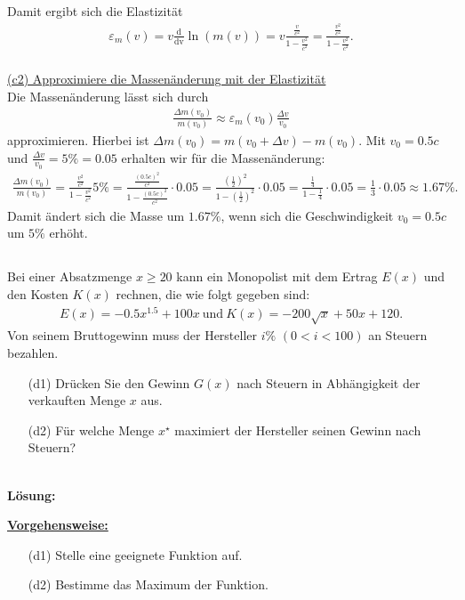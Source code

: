 Damit ergibt sich die Elastizität 
\begin{align*}
	\varepsilon_m(v) = v \frac{\mathrm{d}}{\mathrm{dv}}\ln(m(v))=
	v \frac{\frac{v}{c^2}}{1 - \frac{v^2}{c^2}}
	=\frac{\frac{v^2}{c^2}}{1 - \frac{v^2}{c^2}}.
\end{align*}
\ \\
\underline{(c2) Approximiere die Massenänderung mit der Elastizität}\\
Die Massenänderung lässt sich durch 
\begin{align*}
	\frac{\Delta m(v_0)}{m(v_0)}
	\approx 
	\varepsilon_m(v_0) \frac{\Delta v}{v_0}
\end{align*}
approximieren. Hierbei ist $  \Delta m(v_0) = m(v_0 + \Delta v) - m(v_0)$.
Mit $ v_0 = 0.5 c $ und $ \frac{\Delta v}{v_0}  = 5 \% = 0.05$ erhalten wir für die Massenänderung:
\begin{align*}
	\frac{\Delta m(v_0)}{m(v_0)}
	=
	\frac{\frac{v^2}{c^2}}{1 - \frac{v^2}{c^2}} 5 \%
	=
	\frac{\frac{(0.5 c)^2}{c^2}}{1 - \frac{(0.5 c)^2}{c^2}} \cdot 0.05
	=
	\frac{\left(\frac{1}{2}\right)^2}{1 - \left(\frac{1}{2}\right)^2}\cdot 0.05
	=
	\frac{\frac{1}{4}}{1- \frac{1}{4}} \cdot 0.05
	=
	\frac{1}{3} \cdot 0.05 \approx 1.67 \%.
\end{align*}
Damit ändert sich die Masse um $ 1.67 \% $, wenn sich die Geschwindigkeit $ v_0 =0.5 c $ um $ 5 \% $ erhöht.


\newpage
\subsection*{}
Bei einer Absatzmenge $ x \geq 20  $ kann ein Monopolist mit dem Ertrag $ E(x) $ und den Kosten $ K(x) $ rechnen, die wie folgt gegeben sind:
\begin{align*}
	E(x) = -0.5 x^{1.5} +100 x \ \textrm{und} \ K(x) = -200\sqrt{x} + 50 x +120.
\end{align*}
Von seinem Bruttogewinn muss der Hersteller $ i \% $  $ (0 < i < 100) $ an Steuern bezahlen.
\begin{enumerate}
	\item[(d1)]
	Drücken Sie den Gewinn $ G(x) $ nach Steuern in Abhängigkeit der verkauften Menge $ x $ aus.
	\item[(d2)] 
	Für welche Menge $ x^\star $ maximiert der Hersteller seinen Gewinn nach Steuern?
\end{enumerate}
\ \\
\textbf{Lösung:}
\begin{mdframed}
	\underline{\textbf{Vorgehensweise:}}
	\begin{enumerate}
		\item[(d1)] Stelle eine geeignete Funktion auf.
		\item[(d2)] Bestimme das Maximum der Funktion.
 	\end{enumerate}
\end{mdframed}


